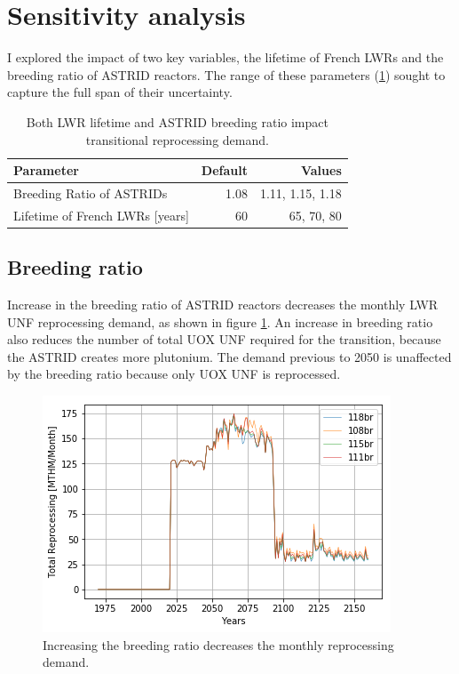 \section{Sensitivity analysis}

I explored the impact of two key variables, the lifetime of French
\glspl{LWR} and the breeding ratio of \gls{ASTRID} reactors. The range
of these parameters (\cref{tab:sen_par}) sought to capture the full
span of their uncertainty.


\begin{table}[h]
    \centering
    \caption{Both \gls{LWR} lifetime and \gls{ASTRID} breeding ratio impact 
    transitional reprocessing demand.}
    \begin{tabularx}{0.8\textwidth}{lrr}
        \hline
        \textbf{Parameter} & \textbf{Default} & \textbf{Values} \\
        \hline
        Breeding Ratio of \glspl{ASTRID} & 1.08 & 1.11, 1.15, 1.18 \\ 
        Lifetime of French \glspl{LWR} [years] & 60  & 65, 70, 80 \\
        \hline
    \end{tabularx}
    \label{tab:sen_par}
\end{table}

\subsection{Breeding ratio}

Increase in the breeding ratio of \gls{ASTRID} reactors
decreases the monthly \gls{LWR} \gls{UNF} reprocessing demand, as shown in 
figure \ref{fig:br_rep}. 
An increase in breeding ratio also reduces the number of total \gls{UOX} \gls{UNF}
required for the transition, because the \gls{ASTRID} creates more plutonium.
The demand previous to 2050 is unaffected by the 
breeding ratio because only \gls{UOX} \gls{UNF} is reprocessed. 

\begin{figure}[htbp!]
    \begin{center}
        \includegraphics[scale=0.7]{./images/sensitivity/br_tot_rep.png}
    \end{center}
    \caption{Increasing the breeding ratio decreases the monthly reprocessing 
    demand.}
    \label{fig:br_rep}
\end{figure}



